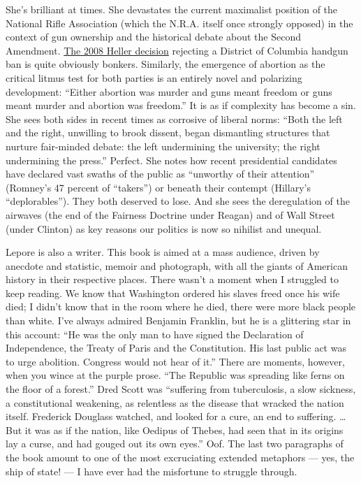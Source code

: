 She's brilliant at times. She devastates the current maximalist position
of the National Rifle Association (which the N.R.A. itself once strongly
opposed) in the context of gun ownership and the historical debate about
the Second Amendment.
\href{https://www.supremecourt.gov/opinions/07pdf/07-290.pdf}{The 2008
Heller decision} rejecting a District of Columbia handgun ban is quite
obviously bonkers. Similarly, the emergence of abortion as the critical
litmus test for both parties is an entirely novel and polarizing
development: ``Either abortion was murder and guns meant freedom or guns
meant murder and abortion was freedom.'' It is as if complexity has
become a sin. She sees both sides in recent times as corrosive of
liberal norms: ``Both the left and the right, unwilling to brook
dissent, began dismantling structures that nurture fair-minded debate:
the left undermining the university; the right undermining the press.''
Perfect. She notes how recent presidential candidates have declared vast
swaths of the public as ``unworthy of their attention'' (Romney's 47
percent of ``takers'') or beneath their contempt (Hillary's
``deplorables''). They both deserved to lose. And she sees the
deregulation of the airwaves (the end of the Fairness Doctrine under
Reagan) and of Wall Street (under Clinton) as key reasons our politics
is now so nihilist and unequal.

Lepore is also a writer. This book is aimed at a mass audience, driven
by anecdote and statistic, memoir and photograph, with all the giants of
American history in their respective places. There wasn't a moment when
I struggled to keep reading. We know that Washington ordered his slaves
freed once his wife died; I didn't know that in the room where he died,
there were more black people than white. I've always admired Benjamin
Franklin, but he is a glittering star in this account: ``He was the only
man to have signed the Declaration of Independence, the Treaty of Paris
and the Constitution. His last public act was to urge abolition.
Congress would not hear of it.'' There are moments, however, when you
wince at the purple prose. ``The Republic was spreading like ferns on
the floor of a forest.'' Dred Scott was ``suffering from tuberculosis, a
slow sickness, a constitutional weakening, as relentless as the disease
that wracked the nation itself. Frederick Douglass watched, and looked
for a cure, an end to suffering. \ldots{} But it was as if the nation,
like Oedipus of Thebes, had seen that in its origins lay a curse, and
had gouged out its own eyes.'' Oof. The last two paragraphs of the book
amount to one of the most excruciating extended metaphors --- yes, the
ship of state! --- I have ever had the misfortune to struggle through.

